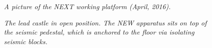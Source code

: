 \begin{figure}[hpt!]
    \bigskip
    \begin{center}\leavevmode
        \caption{\textit{A picture of the NEXT working platform (April, 2016).}}
        \label{fig.WPP}
    \end{center}
\end{figure}

%
%
%


\begin{figure}[hpt!]
    \bigskip
    \begin{center}\leavevmode
        \caption{\textit{The lead castle in open position. The NEW apparatus sits on top of the seismic pedestal, which is anchored to the floor via isolating seismic blocks.}}
        \label{fig.LCWN}
    \end{center}
\end{figure}

